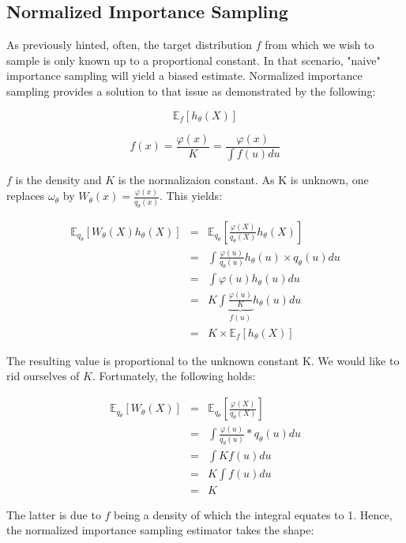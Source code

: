 \subsection{Normalized Importance Sampling}

As previously hinted, often, the target distribution $f$ from which we wish to sample is only known up to a proportional constant. In that scenario, "naive" importance sampling will yield a biased estimate. Normalized importance sampling provides a solution to that issue as demonstrated by the following: 

$$\mathbb E_f \left[ h_\theta(X) \right]$$

$$f(x) = \frac{\varphi(x)}{K} = \frac{\varphi(x)}{ \int f(u) du}$$

$f$ is the density and $K$ is the normalizaion constant. As K is unknown, one replaces $\omega_\theta$ by $W_\theta(x) = \frac{\varphi(x)}{q_\theta(x)}$. 
This yields:

$$
\begin{array}{rcl}
\mathbb E_{q_\theta}\left[ W_\theta(X) h_\theta(X) \right] &=& \mathbb E_{q_\theta}\left[ \frac{\varphi(X)}{q_\theta(X)} h_\theta(X) \right]
\\
&=& \displaystyle\int \frac{\varphi(u)}{q_\theta(u)} h_\theta(u) \times q_\theta(u) du
\\
&=& \displaystyle\int \varphi(u) h_\theta(u)du
\\
&=& K \displaystyle\int \underbrace{\frac{\varphi(u)} K}_{f(u)} h_\theta(u)du
\\
&=& K \times \mathbb E_{f}\left[ h_\theta(X) \right]
\end{array}$$

The resulting value is proportional to the unknown constant K. We would like to rid ourselves of $K$. Fortunately, the following holds:

$$
\begin{array}{rcl}
\mathbb E_{q_\theta}\left[ W_\theta(X) \right] 
&=& \mathbb E_{q_\theta}\left[ \frac{\varphi(X)}{q_\theta(X)} \right]
\\
&=&
\displaystyle \int \frac{\varphi(u)}{q_\theta(u)} * q_\theta(u) du 
\\
&=&
\displaystyle\int K f(u) du 
\\
&=& K \displaystyle\int f(u) du 
\\
&=& K
\end{array}
$$

The latter is due to $f$ being a density of which the integral equates to 1. Hence, the normalized importance sampling estimator takes the shape: 

